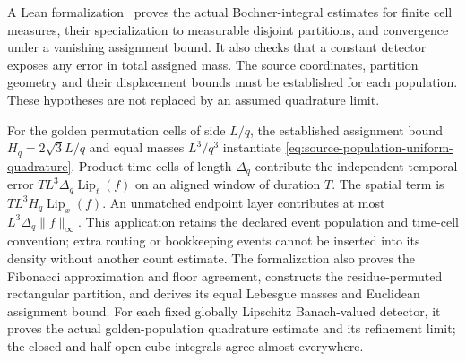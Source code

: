 A Lean formalization~\cite{ophrepo} proves the actual
Bochner-integral estimates for finite cell measures, their specialization
to measurable disjoint partitions, and convergence under a vanishing
assignment bound. It also checks that a constant detector exposes any
error in total assigned mass. The source coordinates, partition geometry
and their displacement bounds must be established for each population.
These hypotheses are not replaced by an assumed quadrature limit.

For the golden permutation cells of side $L/q$, the established assignment
bound $H_q=2\sqrt3L/q$ and equal masses $L^3/q^3$ instantiate
\eqref{eq:source-population-uniform-quadrature}. Product time cells of
length $\Delta_q$ contribute the independent temporal error
$TL^3\Delta_q\operatorname{Lip}_t(f)$ on an aligned window of duration
$T$. The spatial term is $TL^3H_q\operatorname{Lip}_x(f)$.
An unmatched endpoint layer contributes at most
$L^3\Delta_q\|f\|_\infty$. This application retains the declared event
population and time-cell convention; extra routing or bookkeeping events
cannot be inserted into its density without another count estimate.
The formalization also proves the Fibonacci
approximation and floor agreement, constructs the residue-permuted
rectangular partition, and derives its equal Lebesgue masses and Euclidean
assignment bound. For each fixed globally Lipschitz Banach-valued detector,
it proves the actual golden-population quadrature estimate and its
refinement limit; the closed and half-open cube integrals agree almost
everywhere.

